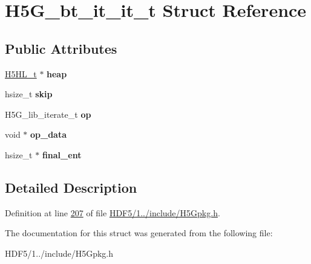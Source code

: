 \hypertarget{struct_h5_g__bt__it__it__t}{}\section{H5\+G\+\_\+bt\+\_\+it\+\_\+it\+\_\+t Struct Reference}
\label{struct_h5_g__bt__it__it__t}
\subsection*{Public Attributes}
\begin{DoxyCompactItemize}
\item 
\mbox{\label{struct_h5_g__bt__it__it__t_ab05ff34163c8a8490906ec8f3cc965b8}} 
\hyperlink{struct_h5_h_l__t}{H5\+H\+L\+\_\+t} $\ast$ {\bfseries heap}
\item 
\mbox{\label{struct_h5_g__bt__it__it__t_acfbcd6b112d90f844f07b7fd36ac956a}} 
hsize\+\_\+t {\bfseries skip}
\item 
\mbox{\label{struct_h5_g__bt__it__it__t_a37401a6728f7674043b49995af07ab06}} 
H5\+G\+\_\+lib\+\_\+iterate\+\_\+t {\bfseries op}
\item 
\mbox{\label{struct_h5_g__bt__it__it__t_af5fd2ff1511b0d2eaa26c7c9c51731ad}} 
void $\ast$ {\bfseries op\+\_\+data}
\item 
\mbox{\label{struct_h5_g__bt__it__it__t_a75d0f7771b3f77cb9fcfe2d48924955a}} 
hsize\+\_\+t $\ast$ {\bfseries final\+\_\+ent}
\end{DoxyCompactItemize}


\subsection{Detailed Description}


Definition at line \hyperlink{_h_d_f5_21_810_81_2include_2_h5_gpkg_8h_source_l00207}{207} of file \hyperlink{_h_d_f5_21_810_81_2include_2_h5_gpkg_8h_source}{H\+D\+F5/1../include/\+H5\+Gpkg.\+h}.



The documentation for this struct was generated from the following file\+:\begin{DoxyCompactItemize}
\item 
H\+D\+F5/1../include/\+H5\+Gpkg.\+h\end{DoxyCompactItemize}
